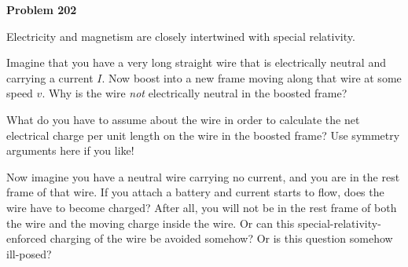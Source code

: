 \documentclass[12pt]{article}
\begin{document}
\begin{pottproblem}
\textbf{Problem 202}

Electricity and magnetism are closely intertwined with special relativity.

Imagine that you have a very long straight wire that is electrically
neutral and carrying a
current $I$. Now boost into a new frame moving along that wire at some speed $v$.
Why is the wire \emph{not} electrically neutral in the boosted frame?

What do you have to assume about the wire in order to calculate the net
electrical charge per unit length on the wire in the boosted frame?
Use symmetry arguments here if you like!

Now imagine you have a neutral wire carrying no current, and you are in the
rest frame of that wire. If you attach a battery and current starts to flow,
does the wire have to become charged? After all, you will not be in the rest
frame of both the wire and the moving charge inside the wire.
Or can this special-relativity-enforced
charging of the wire be avoided somehow? Or is this question somehow ill-posed?

\end{pottproblem}
\end{document}
